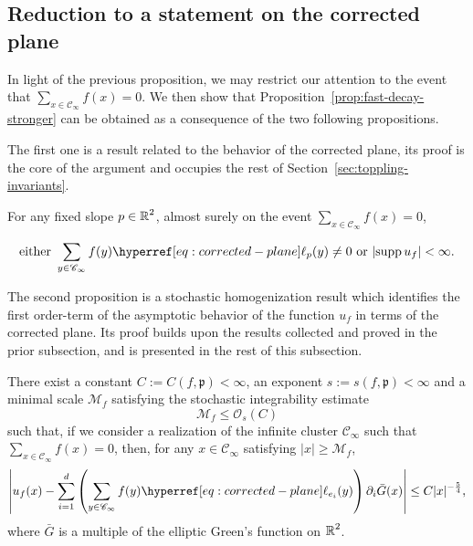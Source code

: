 \documentclass[12pt]{amsart}
\numberwithin{equation}{section}
\begin{document}
	\subsection{Reduction to a statement on the corrected plane}
	In light of the previous proposition, we may restrict our attention to the event that $\sum_{x \in \mathscr{C}_{\infty}} f(x) = 0$.
	We then show that Proposition~\ref{prop:fast-decay-stronger} can be obtained as a consequence of the two following propositions.
	
	The first one is a result related to the behavior of the corrected plane, its proof is the core of the argument and occupies the rest of Section~\ref{sec:toppling-invariants}. 
	
	\begin{prop} \label{prop:gradient-trichotomy}
		For any fixed slope $p \in \operatorname{\mathbb{R}}^2$, almost surely on the event $\sum_{x \in \mathscr{C}_\infty} f(x) = 0$, 
		
		\begin{equation} \label{eq:gradient-growth-bound}
			\mbox{either}~ \sum_{y \in \mathscr{C}_\infty} f(y) \ellp{p}(y) \neq 0 ~\mbox{or}~ |\supp u_f| < \infty.
		\end{equation}
	\end{prop}
	
	The second proposition is a stochastic homogenization result which identifies the first order-term of the asymptotic behavior of the function $u_f$ in terms of the corrected plane. Its proof builds upon the results collected and proved in the prior subsection, and is presented in the rest of this subsection.
	
	
	\begin{prop} \label{prop:two-scale-expansion-mean-zero}
		There exist a constant $C := C ( f, \mathfrak{p}) < \infty$, an exponent $s := s(f, \mathfrak{p}) < \infty$ and a minimal scale $\mathcal{M}_f$ satisfying the stochastic integrability estimate
		\begin{equation} \label{eq:stochastic-integrability-bound-two-scale-expansion}
			\mathcal{M}_f \leq \mathcal{O}_s (C) 
		\end{equation}
		such that, if we consider a realization of the infinite cluster $\mathscr{C}_\infty$ such that $\sum_{x \in \mathscr{C}_{\infty}} f(x) = 0 $, then, for any $x \in \mathscr{C}_\infty$ satisfying $|x| \geq \mathcal{M}_f$, 
		\begin{equation} \label{eq:two-scale-expansion-mean-zero}
			\left| u_f (x) -  \sum_{i = 1}^d \left(\sum_{y \in \mathscr{C}_\infty} f(y) \ellp{e_i}(y) \right) \partial_i \bar G(x) \right| \leq C |x|^{-\frac{5}{4}},
		\end{equation}
		where $\bar G$ is a multiple of the elliptic Green's function on $\operatorname{\mathbb{R}}^2$. 
	\end{prop} 
	
\end{document}
